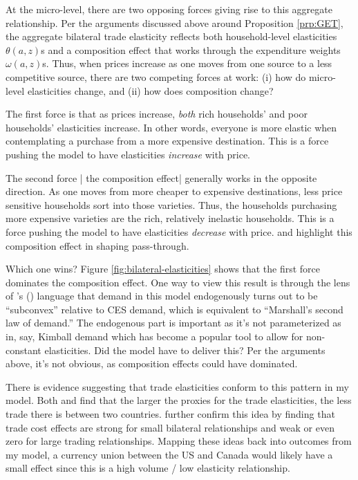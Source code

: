 \documentclass[12pt,pdftex]{article}
\def\citeapos#1{\citeauthor{#1}'s (\citeyear{#1})}
\begin{document}
\begin{onehalfspacing}
At the micro-level, there are two opposing forces giving rise to this aggregate relationship. Per the arguments discussed above around Proposition \ref{prp:GET}, the aggregate bilateral trade elasticity reflects both household-level elasticities $\theta(a,z)$s and a composition effect that works through the expenditure weights $\omega(a,z)$s. Thus, when prices increase as one moves from one source to a less competitive source, there are two competing forces at work: (i) how do micro-level elasticities change, and (ii) how does composition change?

The first force is that as prices increase, \emph{both} rich households' and poor households' elasticities increase. In other words, everyone is more elastic when contemplating a purchase from a more expensive destination. This is a force pushing the model to have elasticities \emph{increase} with price.

The second force | the composition effect| generally works in the opposite direction. As one moves from more cheaper to expensive destinations, less price sensitive households sort into those varieties. Thus, the households purchasing more expensive varieties are the rich, relatively inelastic households. This is a force pushing the model to have elasticities \emph{decrease} with price. \citet{nakamura2010accounting} and \citet*{head2021poor} highlight this composition effect in shaping pass-through.

Which one wins? Figure \ref{fig:bilateral-elasticities} shows that the first force dominates the composition effect. One way to view this result is through the lens of \citeapos{mrazova2017not} language that demand in this model endogenously turns out to be ``subconvex'' relative to CES demand, which is equivalent to ``Marshall's second law of demand.'' The endogenous part is important as it's not parameterized as in, say, Kimball demand which has become a popular tool to allow for non-constant elasticities. Did the model have to deliver this? Per the arguments above, it's not obvious, as composition effects could have dominated.

There is evidence suggesting that trade elasticities conform to this pattern in my model. Both \citet{novy2013international} and \citet{carrere2020gravity} find that the larger the proxies for the trade elasticities, the less trade there is between two countries. \citet{chen2022gravity} further confirm this idea by finding that trade cost effects are strong for small bilateral relationships and weak or even zero for large trading relationships. Mapping these ideas back into outcomes from my model, a currency union between the US and Canada would likely have a small effect since this is a high volume / low elasticity relationship.


\end{onehalfspacing}
\end{document}
